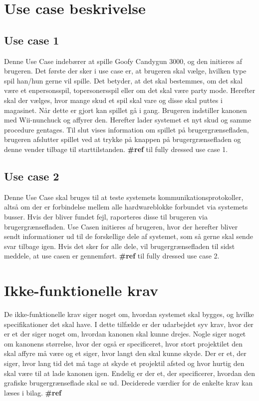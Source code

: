 \newpage
\section{Use case beskrivelse}
\subsection{Use case 1}
Denne Use Case indebærer at spille Goofy Candygun 3000, og den initieres af brugeren. Det første der sker i use case er, at brugeren skal vælge, hvilken type spil han/hun gerne vil spille. Det betyder, at det skal bestemmes, om det skal være et enpersonsspil, topersonersspil eller om det skal være party mode. Herefter skal der vælges, hvor mange skud et spil skal vare og disse skal puttes i magasinet. Når dette er gjort kan spillet gå i gang. Brugeren indstiller kanonen med Wii-nunchuck og affyrer den. Herefter lader systemet et nyt skud og samme procedure gentages. Til slut vises information om spillet på brugergrænsefladen, brugeren afslutter spillet ved at trykke på knappen på brugergrænsefladen og denne vender tilbage til starttilstanden. \textbf{\#ref} til fully dressed use case 1.

\subsection{Use case 2}
Denne Use Case skal bruges til at teste systemets kommunikationsprotokoller, altså om der er forbindelse mellem alle hardwareblokke forbundet via systemets busser. Hvis der bliver fundet fejl, raporteres disse til brugeren via brugergrænsefladen. Use Casen initieres af brugeren, hvor der herefter bliver sendt informationer ud til de forskellige dele af systemet, som så gerne skal sende svar tilbage igen. Hvis det sker for alle dele, vil brugergrænsefladen til sidst meddele, at use casen er gennemført. \textbf{\#ref} til fully dressed use case 2.


\section{Ikke-funktionelle krav}
De ikke-funktionelle krav siger noget om, hvordan systemet skal bygges, og hvilke specifikationer det skal have. I dette tilfælde er der udarbejdet syv krav, hvor der er et der siger noget om, hvordan kanonen skal kunne drejes. Nogle siger noget om kanonens størrelse, hvor der også er specificeret, hvor stort projektilet den skal affyre må være og et siger, hvor langt den skal kunne skyde. Der er et, der siger, hvor lang tid det må tage at skyde et projektil afsted og hvor hurtig den skal være til at lade kanonen igen. Endelig er der et, der specificerer, hvordan den grafiske brugergrænseflade skal se ud. Deciderede værdier for de enkelte krav kan læses i bilag. \textbf{\#ref}







